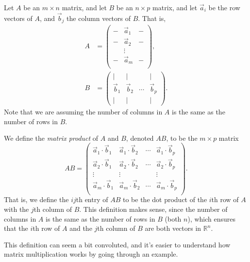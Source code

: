 \documentclass{ximera}
\begin{document}
\begin{definition}
Let $A$ be an $m\times n$ matrix, and let $B$ be an $n\times p$ matrix, and let $\vec{a}_i$ be the row vectors of $A$, and $\vec{b}_j$ the column vectors of $B$. That is, 
\begin{align*}
A &= \left(\begin{array}{ccc}
- & \vec{a}_1 & -\\
- & \vec{a}_2 & -\\
& \vdots &\\
- & \vec{a}_m & -\\
\end{array}\right), \\
B &= \left(\begin{array}{cccc}
| & | & & |\\
\vec{b}_1 & \vec{b}_2 & \cdots & \vec{b}_p\\
| & | & & |
\end{array}\right).
\end{align*}
Note that we are assuming the number of columns in $A$ is the same as the number of rows in $B$.

We define the \emph{matrix product} of $A$ and $B$, denoted $AB$, to be the $m\times p$ matrix
\[
AB = \left(\begin{array}{cccc}
\vec{a}_1\cdot \vec{b}_1 & \vec{a}_1\cdot \vec{b}_2 & \cdots & \vec{a}_1\cdot \vec{b}_p\\
\vec{a}_2\cdot \vec{b}_1 & \vec{a}_2\cdot \vec{b}_2 & \cdots & \vec{a}_2\cdot \vec{b}_p\\
\vdots & \vdots & & \vdots\\
\vec{a}_m\cdot \vec{b}_1 & \vec{a}_m\cdot \vec{b}_2 & \cdots & \vec{a}_m\cdot \vec{b}_p\\
\end{array}\right).
\] 
That is, we define the $ij$th entry of $AB$ to be the dot product of the $i$th row of $A$ with the $j$th column of $B$. This definition makes sense, since the number of columns in $A$ is the same as the number of rows in $B$ (both $n$), which ensures that the $i$th row of $A$ and the $j$th column of $B$ are both vectors in $\mathbb{R}^n$.
\end{definition}

This definition can seem a bit convoluted, and it's easier to understand how matrix multiplication works by going through an example.
\end{document}
